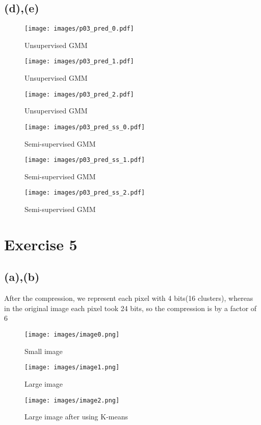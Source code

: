 \documentclass{article}
\begin{document}
\newpage

\subsection*{(d),(e)}
\begin{figure}[h]
  \centering
  \texttt{[image: images/p03\_pred\_0.pdf]}
  \caption{Unsupervised GMM}
  \label{fig:enter-label}
\end{figure}

\begin{figure}
  \centering
  \texttt{[image: images/p03\_pred\_1.pdf]}
  \caption{Unsupervised GMM}
  \label{fig:enter-label}
\end{figure}

\begin{figure}
  \centering
  \texttt{[image: images/p03\_pred\_2.pdf]}
  \caption{Unsupervised GMM}
  \label{fig:enter-label}
\end{figure}

\begin{figure}
  \centering
  \texttt{[image: images/p03\_pred\_ss\_0.pdf]}
  \caption{Semi-supervised GMM}
  \label{fig:enter-label}
\end{figure}

\begin{figure}
  \centering
  \texttt{[image: images/p03\_pred\_ss\_1.pdf]}
  \caption{Semi-supervised GMM}
  \label{fig:enter-label}
\end{figure}

\begin{figure}
  \centering
  \texttt{[image: images/p03\_pred\_ss\_2.pdf]}
  \caption{Semi-supervised GMM}
  \label{fig:enter-label}
\end{figure}

\newpage

\section*{Exercise 5}
\subsection*{(a),(b)}
After the compression, we represent each pixel with 4 bits(16 clusters), whereas in the original image each pixel took 24 bits, so the compression is by a factor of 6

\begin{figure}[h]
  \centering
  \texttt{[image: images/image0.png]}
  \caption{Small image}
  \label{fig:enter-label}
\end{figure}

\begin{figure}
  \centering
  \texttt{[image: images/image1.png]}
  \caption{Large image}
  \label{fig:enter-label}
\end{figure}

\begin{figure}
  \centering
  \texttt{[image: images/image2.png]}
  \caption{Large image after using K-means}
  \label{fig:enter-label}
\end{figure}
\end{document}
